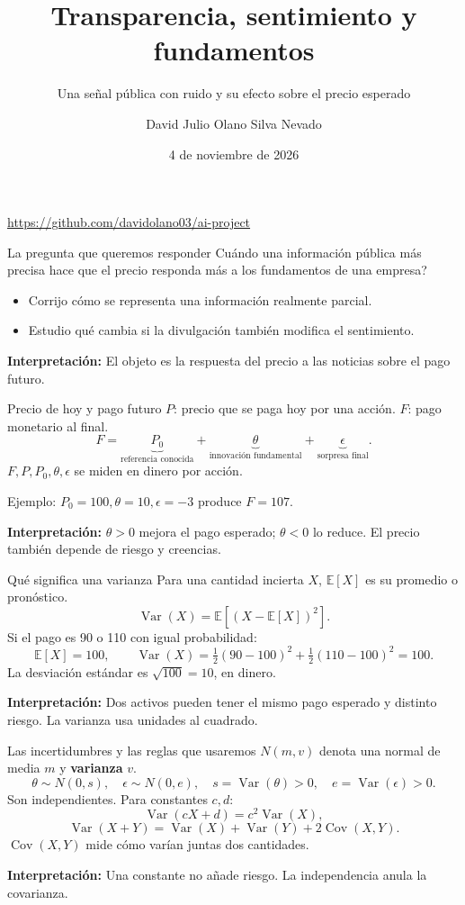 \documentclass[aspectratio=169,11pt]{beamer}
\title{Transparencia, sentimiento y fundamentos}
\subtitle{Una señal pública con ruido y su efecto sobre el precio esperado}
\author{David Julio Olano Silva Nevado}
\date{4 de noviembre de 2026}
\newcommand{\E}{\mathbb E}
\newcommand{\Var}{\operatorname{Var}}
\newcommand{\Cov}{\operatorname{Cov}}
\newcommand{\idea}[1]{\par\medskip\textbf{Interpretación:} #1}
\begin{document}
\begin{frame}[plain]
\titlepage
\begin{center}\small\url{https://github.com/davidolano03/ai-project}\end{center}
\end{frame}

\begin{frame}{La pregunta que queremos responder}
\large
\textquestiondown{}Cuándo una información pública más precisa hace que el
precio responda más a los fundamentos de una empresa?
\normalsize\medskip
\begin{itemize}
\item Corrijo cómo se representa una información realmente parcial.
\item Estudio qué cambia si la divulgación también modifica el sentimiento.
\end{itemize}
\idea{El objeto es la respuesta del precio a las noticias sobre el pago futuro.}
\end{frame}

\begin{frame}{Precio de hoy y pago futuro}
\(P\): precio que se paga hoy por una acción. \(F\): pago monetario al final.
\[
F=\underbrace{P_0}_{\text{referencia conocida}}
 +\underbrace{\theta}_{\text{innovación fundamental}}
 +\underbrace{\epsilon}_{\text{sorpresa final}}.
\]
\(F,P,P_0,\theta,\epsilon\) se miden en dinero por acción.
\medskip\par
Ejemplo: \(P_0=100,\theta=10,\epsilon=-3\) produce \(F=107\).
\idea{\(\theta>0\) mejora el pago esperado; \(\theta<0\) lo reduce.
El precio también depende de riesgo y creencias.}
\end{frame}

\begin{frame}{Qué significa una varianza}
Para una cantidad incierta \(X\), \(\E[X]\) es su promedio o pronóstico.
\[
\Var(X)=\E[(X-\E[X])^2].
\]
Si el pago es 90 o 110 con igual probabilidad:
\[
\E[X]=100,\qquad
\Var(X)=\tfrac12(90-100)^2+\tfrac12(110-100)^2=100.
\]
La desviación estándar es \(\sqrt{100}=10\), en dinero.
\idea{Dos activos pueden tener el mismo pago esperado y distinto riesgo.
La varianza usa unidades al cuadrado.}
\end{frame}

\begin{frame}{Las incertidumbres y las reglas que usaremos}
\(N(m,v)\) denota una normal de media \(m\) y \textbf{varianza} \(v\).
\[
\theta\sim N(0,s),\quad \epsilon\sim N(0,e),\quad
s=\Var(\theta)>0,\quad e=\Var(\epsilon)>0.
\]
Son independientes. Para constantes \(c,d\):
\[
\Var(cX+d)=c^2\Var(X),
\]
\[
\Var(X+Y)=\Var(X)+\Var(Y)+2\Cov(X,Y).
\]
\(\Cov(X,Y)\) mide cómo varían juntas dos cantidades.
\idea{Una constante no añade riesgo. La independencia anula la covarianza.}
\end{frame}
\end{document}
